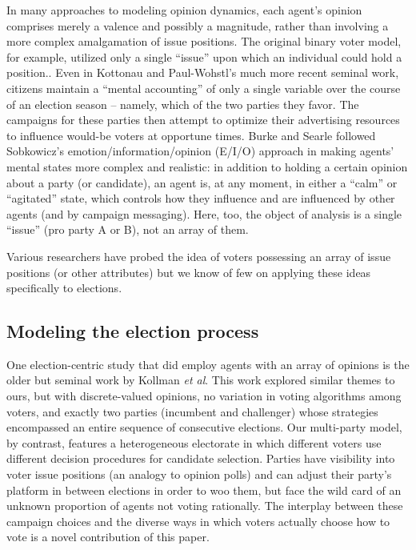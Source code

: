 In many approaches to modeling opinion dynamics, each agent's opinion comprises
merely a valence and possibly a magnitude, rather than involving a more complex
amalgamation of issue positions. The original binary voter model, for example,
utilized only a single ``issue'' upon which an individual could hold a
position.\cite{holley_ergodic_1975,clifford_model_1973}. Even in Kottonau and
Paul-Wohstl's much more recent seminal work\cite{kottonau_simulating_2004},
citizens maintain a ``mental accounting'' of only a single variable over the
course of an election season -- namely, which of the two parties they favor.
The campaigns for these parties then attempt to optimize their advertising
resources to influence would-be voters at opportune times. Burke and
Searle\cite{burke_quantitatively_2022} followed Sobkowicz's
emotion/information/opinion (E/I/O) approach\cite{sobkowicz_quantitative_2016}
in making agents' mental states more complex and realistic: in addition to
holding a certain opinion about a party (or candidate), an agent is, at any
moment, in either a ``calm'' or ``agitated'' state, which controls how they
influence and are influenced by other agents (and by campaign messaging). Here,
too, the object of analysis is a single ``issue'' (pro party A or B), not an
array of them.

Various researchers have probed the idea of voters possessing an array of issue
positions (or other
attributes)\cite{axelrod_dissemination_1997,fortunato_vector_2005,weisbuch_meet_2002,schweighofer_agent-based_2020,jung_cultural_2021,sirbu_opinion_2013}
but we know of few on applying these ideas specifically to elections.

\subsection{Modeling the election process}

One election-centric study that did employ agents with an array of opinions is
the older but seminal work by Kollman \textit{et
al}\cite{kollman_adaptive_1992}. This work explored similar themes to ours, but
with discrete-valued opinions, no variation in voting algorithms among voters,
and exactly two parties (incumbent and challenger) whose strategies encompassed
an entire sequence of consecutive elections. Our multi-party model, by
contrast, features a heterogeneous electorate in which different voters use
different decision procedures for candidate selection. Parties have visibility
into voter issue positions (an analogy to opinion polls) and can adjust their
party's platform in between elections in order to woo them, but face the wild
card of an unknown proportion of agents not voting rationally. The interplay
between these campaign choices and the diverse ways in which voters actually
choose how to vote is a novel contribution of this paper.

